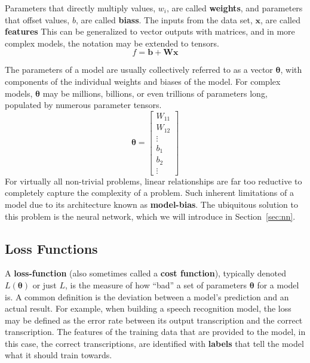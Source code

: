 \documentclass[12pt]{report}
\theoremstyle{definition}
\theoremstyle{remark}
\begin{document}
Parameters that directly multiply values, $w_i$, are called \textbf{\glspl{weight}}, and parameters that offset values, $b$, are called \textbf{\glspl{bias}}. The inputs from the data set, $\mathbf{x}$, are called \textbf{\glspl{feature}} This can be generalized to vector outputs with matrices, and in more complex models, the notation may be extended to tensors.
\begin{equation}
    f = \mathbf{b} + \mathbf{W}\mathbf{x}
\end{equation}

The parameters of a model are usually collectively referred to as a vector $\boldsymbol{\theta}$, with components of the individual weights and biases of the model. For complex models, $\boldsymbol{\theta}$ may be millions, billions, or even trillions of parameters long, populated by numerous parameter tensors.
\begin{equation}
    \boldsymbol{\theta} = \begin{bmatrix}
        W_{11} \\
        W_{12} \\
        \vdots \\
        b_1 \\
        b_2 \\
        \vdots
    \end{bmatrix}
\end{equation}
For virtually all non-trivial problems, linear relationships are far too reductive to completely capture the complexity of a problem. Such inherent limitations of a model due to its architecture known as \textbf{\gls{model-bias}}. The ubiquitous solution to this problem is the neural network, which we will introduce in Section~\ref{sec:nn}.


\subsection{Loss Functions}

A \textbf{\gls{loss-function}} (also sometimes called a \textbf{cost function}), typically denoted $L(\boldsymbol{\theta})$ or just $L$, is the measure of how ``bad'' a set of parameters $\boldsymbol{\theta}$ for a model is. A common definition is the deviation between a model's prediction and an actual result. For example, when building a speech recognition model, the loss may be defined as the error rate between its output transcription and the correct transcription. The features of the training data that are provided to the model, in this case, the correct transcriptions, are identified with \textbf{\glspl{label}} that tell the model what it should train towards.
\end{document}

